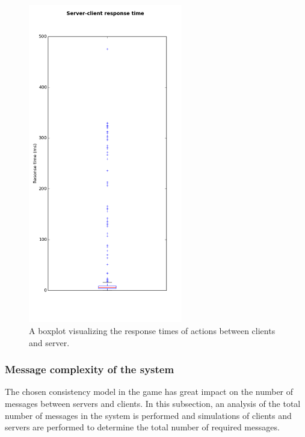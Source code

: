 		\begin{figure}[h!]
		  \centering
		    \includegraphics[width=0.6\textwidth, height=0.59\textheight]{images/boxplot_response_times}
		    
		  \caption{A boxplot visualizing the response times of actions between clients and server.}
		  \label{fig:boxplot_response_times}
		\end{figure}
		
	\subsubsection{Message complexity of the system}
	\label{subsubsec:nummessages}
		The chosen consistency model in the game has great impact on the number of messages between servers and clients. 
		In this subsection, an analysis of the total number of messages in the system is performed and simulations of clients and servers are performed to determine the total number of required messages.\\
		
		
